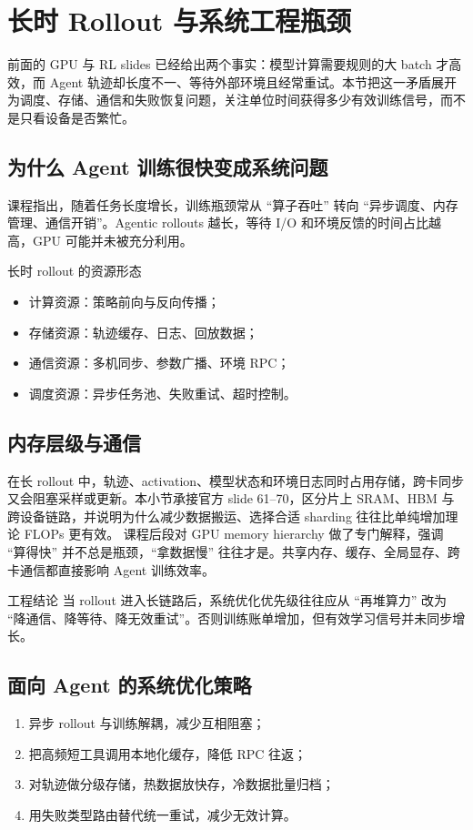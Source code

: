 \section{长时 Rollout 与系统工程瓶颈}

前面的 GPU 与 RL slides 已经给出两个事实：模型计算需要规则的大 batch 才高效，而 Agent 轨迹却长度不一、等待外部环境且经常重试。本节把这一矛盾展开为调度、存储、通信和失败恢复问题，关注单位时间获得多少有效训练信号，而不是只看设备是否繁忙。

\subsection{为什么 Agent 训练很快变成系统问题}
课程指出，随着任务长度增长，训练瓶颈常从 ``算子吞吐'' 转向 ``异步调度、内存管理、通信开销''。Agentic rollouts 越长，等待 I/O 和环境反馈的时间占比越高，GPU 可能并未被充分利用。

\begin{knowledgebox}{长时 rollout 的资源形态}
\begin{itemize}
    \item 计算资源：策略前向与反向传播；
    \item 存储资源：轨迹缓存、日志、回放数据；
    \item 通信资源：多机同步、参数广播、环境 RPC；
    \item 调度资源：异步任务池、失败重试、超时控制。
\end{itemize}
\end{knowledgebox}

\subsection{内存层级与通信}
在长 rollout 中，轨迹、activation、模型状态和环境日志同时占用存储，跨卡同步又会阻塞采样或更新。本小节承接官方 slide 61--70，区分片上 SRAM、HBM 与跨设备链路，并说明为什么减少数据搬运、选择合适 sharding 往往比单纯增加理论 FLOPs 更有效。
课程后段对 GPU memory hierarchy 做了专门解释，强调 ``算得快'' 并不总是瓶颈，``拿数据慢'' 往往才是。共享内存、缓存、全局显存、跨卡通信都直接影响 Agent 训练效率。

\begin{importantbox}{工程结论}
当 rollout 进入长链路后，系统优化优先级往往应从 ``再堆算力'' 改为 ``降通信、降等待、降无效重试''。否则训练账单增加，但有效学习信号并未同步增长。
\end{importantbox}

\subsection{面向 Agent 的系统优化策略}
\begin{enumerate}
    \item 异步 rollout 与训练解耦，减少互相阻塞；
    \item 把高频短工具调用本地化缓存，降低 RPC 往返；
    \item 对轨迹做分级存储，热数据放快存，冷数据批量归档；
    \item 用失败类型路由替代统一重试，减少无效计算。
\end{enumerate}

